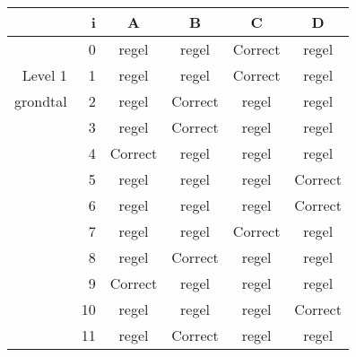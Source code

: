 \begin{tabular}{ rr| c|c|c|c}\hline\hline
     & i & \textbf{A} & \textbf{B} & \textbf{C} & \textbf{D}\\\hline

&0&regel&regel&Correct\cellcolor[gray]{0.6}&regel\\
Level 1 & 1&regel&regel&Correct\cellcolor[gray]{0.6}&regel\\
grondtal &2&regel&Correct\cellcolor[gray]{0.6}&regel&regel\\
&3&regel&Correct\cellcolor[gray]{0.6}&regel&regel\\
&4&Correct\cellcolor[gray]{0.6}&regel&regel&regel\\
&5&regel&regel&regel&Correct\cellcolor[gray]{0.6}\\
&6&regel&regel&regel&Correct\cellcolor[gray]{0.6}\\
&7&regel&regel&Correct\cellcolor[gray]{0.6}&regel\\
&8&regel&Correct\cellcolor[gray]{0.6}&regel&regel\\
&9&Correct\cellcolor[gray]{0.6}&regel&regel&regel\\
&10&regel&regel&regel&Correct\cellcolor[gray]{0.6}\\
&11&regel&Correct\cellcolor[gray]{0.6}&regel&regel\\
\hline\end{tabular}\par\ \newline

